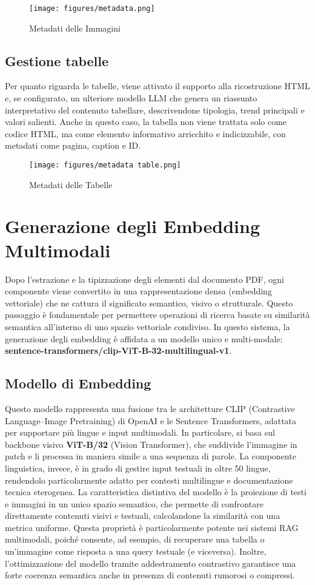 \begin{figure}[!ht]
\centering
\texttt{[image: figures/metadata.png]}
\caption{Metadati delle Immagini}
\end{figure}

\subsection{Gestione tabelle}
Per quanto riguarda le tabelle, viene attivato il supporto alla ricostruzione HTML e, se configurato, un ulteriore modello LLM che genera un riassunto interpretativo del contenuto tabellare, descrivendone tipologia, trend principali e valori salienti. Anche in questo caso, la tabella non viene trattata solo come codice HTML, ma come elemento informativo arricchito e indicizzabile, con metadati come pagina, caption e ID. 

\begin{figure}[!ht]
\centering
\texttt{[image: figures/metadata table.png]}
\caption{Metadati delle Tabelle}
\end{figure}



\section{Generazione degli Embedding Multimodali}
Dopo l’estrazione e la tipizzazione degli elementi dal documento PDF, ogni componente viene convertito in una rappresentazione densa (embedding vettoriale) che ne cattura il significato semantico, visivo o strutturale. Questo passaggio è fondamentale per permettere operazioni di ricerca basate su similarità semantica all’interno di uno spazio vettoriale condiviso. In questo sistema, la generazione degli embedding è affidata a un modello unico e multi-modale: \textbf{sentence-transformers/clip-ViT-B-32-multilingual-v1}.

\subsection{Modello di Embedding}
Questo modello rappresenta una fusione tra le architetture CLIP (Contrastive Language–Image Pretraining) di OpenAI e le Sentence Transformers, adattata per supportare più lingue e input multimodali. In particolare, si basa sul backbone visivo \textbf{ViT-B/32} (Vision Transformer), che suddivide l’immagine in patch e li processa in maniera simile a una sequenza di parole. La componente linguistica, invece, è in grado di gestire input testuali in oltre 50 lingue, rendendolo particolarmente adatto per contesti multilingue e documentazione tecnica eterogenea.
La caratteristica distintiva del modello è la proiezione di testi e immagini in un unico spazio semantico, che permette di confrontare direttamente contenuti visivi e testuali, calcolandone la similarità con una metrica uniforme. Questa proprietà è particolarmente potente nei sistemi RAG multimodali, poiché consente, ad esempio, di recuperare una tabella o un’immagine come risposta a una query testuale (e viceversa). Inoltre, l’ottimizzazione del modello tramite addestramento contrastivo garantisce una forte coerenza semantica anche in presenza di contenuti rumorosi o compressi.
